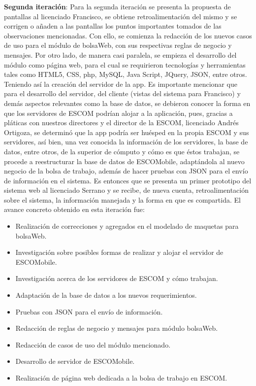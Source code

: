 \noindent
\newline
\textbf{Segunda iteración}: Para la segunda iteración se presenta la propuesta de pantallas al licenciado Francisco, se obtiene retroalimentación del mismo y se corrigen o añaden a las pantallas los puntos importantes tomados de las observaciones mencionadas. Con ello, se comienza la redacción de los nuevos casos de uso para el módulo de bolsaWeb, con sus respectivas reglas de negocio y mensajes.
\newline
\newline
Por otro lado, de manera casi paralela, se empieza el desarrollo del módulo como página web, para el cual se requirieron tecnologías y herramientas tales como HTML5, CSS, php, MySQL, Java Script, JQuery, JSON, entre otros. Teniendo así la creación del servidor de la app. Es importante mencionar que para el desarrollo del servidor, del cliente (vistas del sistema para Francisco) y demás aspectos relevantes como la base de datos, se debieron conocer la forma en que los servidores de ESCOM podrían alojar a la aplicación, pues, gracias a pláticas con nuestros directores y el director de la ESCOM, licenciado Andrés Ortigoza, se determinó que la app podría ser huésped en la propia ESCOM y sus servidores, así bien, una vez conocida la información de los servidores, la base de datos, entre otros, de la superior de cómputo y cómo es que éstos trabajan, se procede a reestructurar la base de datos de ESCOMobile, adaptándola al nuevo negocio de la bolsa de trabajo, además de hacer pruebas con JSON para el envío de información en el sistema.
\newline
Es entonces que se presenta un primer prototipo del sistema web al licenciado Serrano y se recibe, de nueva cuenta, retroalimentación sobre el sistema, la información manejada y la forma en que es compartida. 
\newline
El avance concreto obtenido en esta iteración fue: 
\begin{itemize}
	\item Realización de correcciones y agregados en el modelado de maquetas para bolsaWeb.
	\item Investigación sobre posibles formas de realizar y alojar el servidor de ESCOMobile.
	\item Investigación acerca de los servidores de ESCOM y cómo trabajan.
	\item Adaptación de la base de datos a los nuevos requerimientos.
	\item Pruebas con JSON para el envío de información.
	\item Redacción de reglas de negocio y mensajes para módulo bolsaWeb.
	\item Redacción de casos de uso del módulo mencionado.
	\item Desarrollo de servidor de ESCOMobile.
	\item Realización de página web dedicada a la bolsa de trabajo en ESCOM.
\end{itemize}

